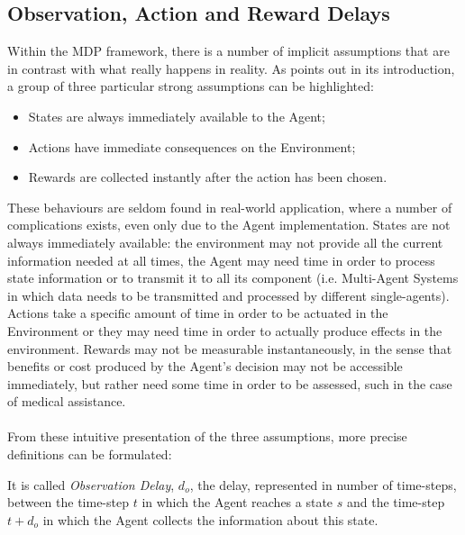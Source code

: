         \subsection{Observation, Action and Reward Delays}
            Within the MDP framework, there is a number of implicit assumptions that are in contrast with what really happens in reality. As  points out in its introduction, a group of three particular strong assumptions can be highlighted:
            \begin{itemize}[topsep=0.5em, partopsep=0.5em]
                \setlength\itemsep{0em}
                \item States are always immediately available to the Agent;
                \item Actions have immediate consequences on the Environment;
                \item Rewards are collected instantly after the action has been chosen.
            \end{itemize}
            These behaviours are seldom found in real-world application, where a number of complications exists, even only due to the Agent implementation. States are not always immediately available: the environment may not provide all the current information needed at all times, the Agent may need time in order to process state information or to transmit it to all its component (i.e. Multi-Agent Systems in which data needs to be transmitted and processed by different single-agents). Actions take a specific amount of time in order to be actuated in the Environment or they may need time in order to actually produce effects in the environment. Rewards may not be measurable instantaneously, in the sense that benefits or cost produced by the Agent's decision may not be accessible immediately, but rather need some time in order to be assessed, such in the case of medical assistance.
            \\\\
            From these intuitive presentation of the three assumptions, more precise definitions can be formulated:
            
            \begin{definition}
                \label{def:obsdelay}
                It is called \textit{Observation Delay}, $d_o$, the delay, represented in number of time-steps, between the time-step $t$ in which the Agent reaches a state $s$ and the time-step $t+d_o$ in which the Agent collects the information about this state.
            \end{definition}
            
